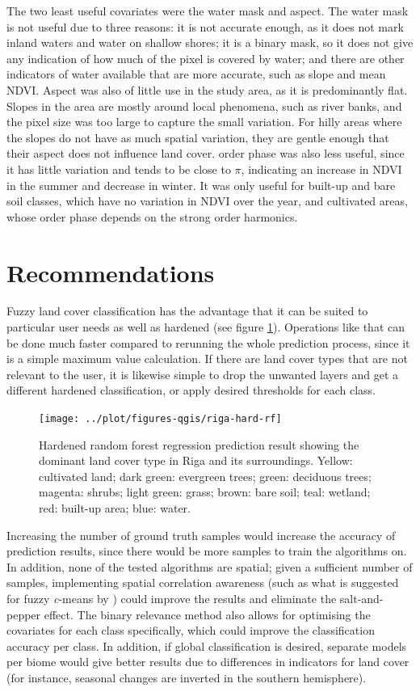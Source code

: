 \documentclass[a4paper,10pt]{book}
\begin{document}
The two least useful covariates were the water mask and aspect. The water mask is not useful due to three reasons: it is not accurate enough, as it does not mark inland waters and water on shallow shores; it is a binary mask, so it does not give any indication of how much of the pixel is covered by water; and there are other indicators of water available that are more accurate, such as slope and mean NDVI. Aspect was also of little use in the study area, as it is predominantly flat. Slopes in the area are mostly around local phenomena, such as river banks, and the pixel size was too large to capture the small variation. For hilly areas where the slopes do not have as much spatial variation, they are gentle enough that their aspect does not influence land cover.  order phase was also less useful, since it has little variation and tends to be close to $\pi{}$, indicating an increase in NDVI in the summer and decrease in winter. It was only useful for built-up and bare soil classes, which have no variation in NDVI over the year, and cultivated areas, whose  order phase depends on the strong  order harmonics.

\section{Recommendations}

Fuzzy land cover classification has the advantage that it can be suited to particular user needs as well as hardened (see figure \ref{fig-hard-rf}). Operations like that can be done much faster compared to rerunning the whole prediction process, since it is a simple maximum value calculation. If there are land cover types that are not relevant to the user, it is likewise simple to drop the unwanted layers and get a different hardened classification, or apply desired thresholds for each class.

\begin{figure}
  \centering
  \texttt{[image: ../plot/figures-qgis/riga-hard-rf]}
  \caption{Hardened random forest regression prediction result showing the dominant land cover type in Riga and its surroundings. Yellow: cultivated land; dark green: evergreen trees; green: deciduous trees; magenta: shrubs; light green: grass; brown: bare soil; teal: wetland; red: built-up area; blue: water.}
  \label{fig-hard-rf}
\end{figure}

Increasing the number of ground truth samples would increase the accuracy of prediction results, since there would be more samples to train the algorithms on. In addition, none of the tested algorithms are spatial; given a sufficient number of samples, implementing spatial correlation awareness (such as what is suggested for fuzzy \textit{c}-means by \citet{gong2013improvedcmeans}) could improve the results and eliminate the salt-and-pepper effect. The binary relevance method also allows for optimising the covariates for each class specifically, which could improve the classification accuracy per class. In addition, if global classification is desired, separate models per biome would give better results due to differences in indicators for land cover (for instance, seasonal changes are inverted in the southern hemisphere).
\end{document}
